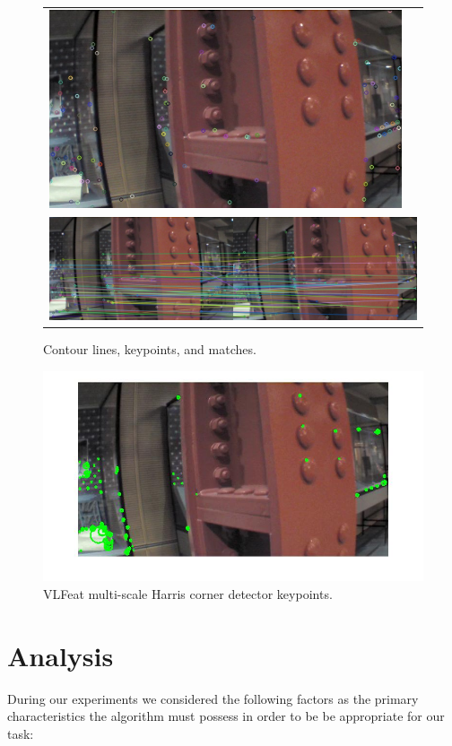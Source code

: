 \documentclass{acmsiggraph}
\begin{document}
\begin{figure}[h]
\begin{tabular}{cc}
    \includegraphics[resolution=150, scale=0.75]{images/contour-kp2} \\
    \multicolumn{2}{c}{\includegraphics[resolution=150, scale=0.77]{images/contour-matches}}
  \end{tabular}
  \caption{Contour lines, keypoints, and matches.}
  \label{fig:contour-ex}
\end{figure}

\begin{figure}[h]
  \centering
  \includegraphics[resolution=150, scale=0.75]{images/vlfeat-kp2}
  \caption{VLFeat multi-scale Harris corner detector keypoints.}
  \label{fig:vlfeat-ex}
\end{figure}

\section{Analysis}
During our experiments we considered the following factors as the primary characteristics the algorithm must possess in order
to be be appropriate for our task:
\end{document}
